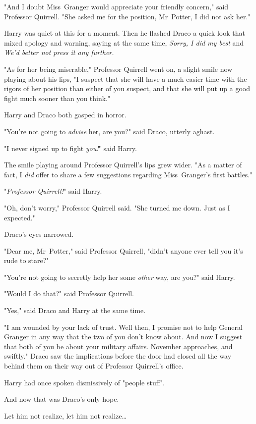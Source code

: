 "And I doubt Miss~Granger would appreciate your friendly concern," said
Professor Quirrell. "She asked me for the position, Mr~Potter, I did not ask
her."

Harry was quiet at this for a moment. Then he flashed Draco a quick look that
mixed apology and warning, saying at the same time, \emph{Sorry, I did my best}
and \emph{We'd better not press it any further.}

"As for her being miserable," Professor Quirrell went on, a slight smile now
playing about his lips, "I suspect that she will have a much easier time with
the rigors of her position than either of you suspect, and that she will put up
a good fight much sooner than you think."

Harry and Draco both gasped in horror.

"You're not going to \emph{advise} her, are you?" said Draco, utterly aghast.

"I never signed up to fight \emph{you!}" said Harry.

The smile playing around Professor Quirrell's lips grew wider. "As a matter of
fact, I \emph{did} offer to share a few suggestions regarding Miss~Granger's
first battles."

"\emph{Professor Quirrell!}" said Harry.

"Oh, don't worry," Professor Quirrell said. "She turned me down. Just as I
expected."

Draco's eyes narrowed.

"Dear me, Mr~Potter," said Professor Quirrell, "didn't anyone ever tell you
it's rude to stare?"

"You're not going to secretly help her some \emph{other} way, are you?" said
Harry.

"Would I do that?" said Professor Quirrell.

"Yes," said Draco and Harry at the same time.

"I am wounded by your lack of trust. Well then, I promise not to help General
Granger in any way that the two of you don't know about. And now I suggest that
both of you be about your military affairs. November approaches, and swiftly."
\later
Draco saw the implications before the door had closed all the way behind them
on their way out of Professor Quirrell's office.

Harry had once spoken dismissively of "people stuff".

And now that was Draco's only hope.

Let him not realize, let him not realize…

